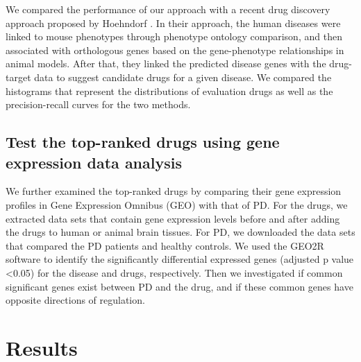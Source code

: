 We compared the performance of our approach with a recent drug discovery approach proposed by Hoehndorf \cite{hoehndorf2012linking}. In their approach, the human diseases were linked to mouse phenotypes through phenotype ontology comparison, and then associated with orthologous genes based on the gene-phenotype relationships in animal models. After that, they linked the predicted disease genes with the drug-target data to suggest candidate drugs for a given disease. We compared the histograms that represent the distributions of evaluation drugs as well as the precision-recall curves for the two methods.

\subsection{Test the top-ranked drugs using gene expression data analysis}
We further examined the top-ranked drugs by comparing their gene expression profiles in Gene Expression Omnibus (GEO) with that of PD. For the drugs, we extracted data sets that contain gene expression levels before and after adding the drugs to human or animal brain tissues. For PD, we downloaded the data sets that compared the PD patients and healthy controls. We used the GEO2R software \cite{barrett2013ncbi} to identify the significantly differential expressed genes (adjusted p value <0.05) for the disease and drugs, respectively. Then we investigated if common significant genes exist between PD and the drug, and if these common genes have opposite directions of regulation.

\section{Results}
